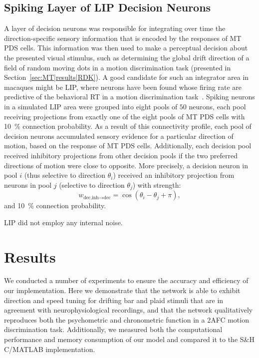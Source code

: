 \subsection{Spiking Layer of LIP Decision Neurons}
\label{sec:MT|LIP}

A layer of decision neurons was responsible for integrating
over time the direction-specific sensory information that is
encoded by the responses of MT \ac{PDS} cells. This information
was then used to make a perceptual decision about the presented
visual stimulus, such as determining the global drift
direction of a field of random moving dots in a motion
discrimination task (presented in Section~\ref{sec:MT|results|RDK}).
A good candidate for such an integrator
area in macaques might be \ac{LIP}, where neurons have been
found whose firing rate are predictive of the behavioral \ac{RT} 
in a motion discrimination 
task~\citep{ShadlenNewsome2001,RoitmanShadlen2002}.
Spiking neurons in a simulated \ac{LIP} area were grouped into
eight pools of $50$ neurons, each pool receiving projections
from exactly one of the eight pools of \ac{MT} \ac{PDS} cells with
\SI{10}{\percent} connection probability. 
As a result of this connectivity
profile, each pool of decision neurons accumulated sensory
evidence for a particular direction of motion, based on the
response of \ac{MT} \ac{PDS} cells.
Additionally, each decision pool received inhibitory projections
from other decision pools if the two preferred directions
of motion were close to opposite. More precisely, a
decision neuron in pool $i$ (thus selective to direction
$\theta_i$) 
received an inhibitory projection from neurons in pool $j$ 
(selective to direction $\theta_j$) with strength:
\begin{equation}
w_{\textrm{dec,inh} \rightarrow \textrm{dec}} = 
	\cos(\theta_i - \theta_j + \pi),
\label{eqn:MT|LIP}
\end{equation}
and \SI{10}{\percent} connection probability.

\ac{LIP} did not employ any internal noise.



\section{Results}

We conducted a number of experiments to ensure the accuracy
and efficiency of our implementation. Here we demonstrate
that the network is able to exhibit direction and speed tuning
for drifting bar and plaid stimuli that are in agreement with
neurophysiological recordings, and that the network qualitatively
reproduces both the psychometric and chronometric
function in a \ac{2AFC} motion discrimination task.
Additionally,
we measured both the computational performance and memory
consumption of our model and compared it to the S\&H
C/MATLAB implementation.

